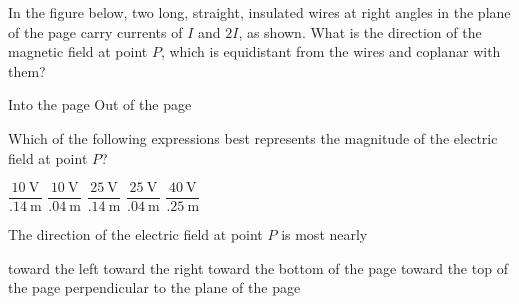 \documentclass[12pt]{../../oss-classkick-exam}
\begin{document}
\begin{questions}
  \uplevel{ \rule{\linewidth}{.5pt}}

  \question In the figure below, two long, straight, insulated wires at right
  angles in the plane of the page carry currents of $I$ and $2I$, as shown.
  What is the direction of the magnetic field at point $P$, which is
  equidistant from the wires and coplanar with them?

  \begin{minipage}{.35\linewidth}
  \end{minipage}
  \begin{minipage}{.4\linewidth}
    \begin{choices}
      \choice Into the page
      \choice Out of the page
      \choice {\huge$\searrow$}
      \choice {\huge$\nwarrow$}
      \choice {\huge$\nearrow$}
    \end{choices}
  \end{minipage}
  
  \question Which of the following expressions best represents the magnitude of
  the electric field at point $P$?
  \label{contour1}

  \begin{oneparchoices}
    \choice $\dfrac{\SI{10}{\volt}}{\SI{.14}{\metre}}$\hspace{.2in}
    \choice $\dfrac{\SI{10}{\volt}}{\SI{.04}{\metre}}$\hspace{.2in}
    \choice $\dfrac{\SI{25}{\volt}}{\SI{.14}{\metre}}$\hspace{.2in}
    \choice $\dfrac{\SI{25}{\volt}}{\SI{.04}{\metre}}$\hspace{.2in}
    \choice $\dfrac{\SI{40}{\volt}}{\SI{.25}{\metre}}$
  \end{oneparchoices}

  \question The direction of the electric field at point $P$ is most nearly
  \label{contour2}
  \begin{choices}
    \choice toward the left
    \choice toward the right
    \choice toward the bottom of the page
    \choice toward the top of the page
    \choice perpendicular to the plane of the page
  \end{choices}
  

\end{questions}
\end{document}
